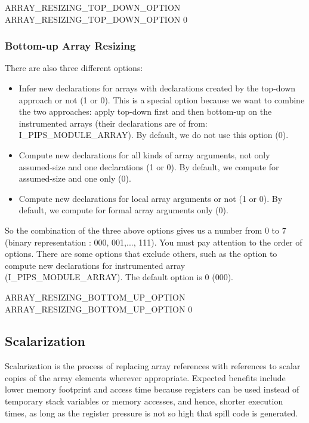 \documentclass[a4paper]{report}
\newenvironment{PipsPass}[1]{\label{pass:#1}}{}
\begin{document}
\begin{PipsProp}{ARRAY_RESIZING_TOP_DOWN_OPTION}
ARRAY_RESIZING_TOP_DOWN_OPTION 0
\end{PipsProp}

\subsubsection*{Bottom-up Array Resizing}

There are also three different options:
\begin{itemize}
\item Infer new declarations for arrays with declarations created by the
  top-down approach or not (1 or 0). This is a special option because we
  want to combine the two approaches: apply top-down first and then
  bottom-up on the instrumented arrays (their declarations are of from:
  I\_PIPS\_MODULE\_ARRAY). By default, we do not use this option (0).
\item Compute new declarations for all kinds of array arguments,
  not only assumed-size and one declarations (1 or 0). By default, we
  compute for assumed-size and one only (0).
\item Compute new declarations for local array arguments or not (1 or 0). By default, we
  compute for formal array arguments only (0).
\end{itemize}
So the combination of the three above options gives us a number from 0 to
7 (binary representation : 000, 001,..., 111). You must pay attention to
the order of options. There are some options that exclude others, such as
the option to compute new declarations for instrumented array
(I\_PIPS\_MODULE\_ARRAY). The default option is 0
(000).

\begin{PipsProp}{ARRAY_RESIZING_BOTTOM_UP_OPTION}
ARRAY_RESIZING_BOTTOM_UP_OPTION 0
\end{PipsProp}

\subsection{Scalarization}

\begin{PipsPass}{scalarization}
  Scalarization is the process of replacing array references with
  references to scalar copies of the array elements wherever
  appropriate. Expected benefits include lower memory footprint and
  access time because registers can be used instead of temporary stack
  variables or memory accesses, and hence, shorter execution times, as
  long as the register pressure is not so high that spill code is
  generated.
\end{PipsPass}
\end{document}

